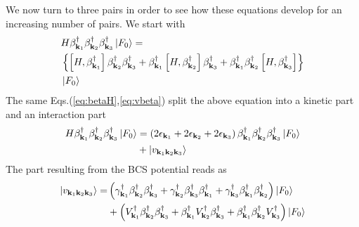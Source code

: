 \documentclass[aps,prb,superscriptaddress,twocolumn]{revtex4}
\begin{document}
We now turn to three pairs in order to see how these equations develop for an
increasing number of pairs. We start with 
\begin{equation}  \label{eq:SchThree}
\begin{split}
&H\beta^{\dagger}_{\mathbf{k} _1}\beta^{\dagger}_{\mathbf{k}
_2}\beta^{\dagger}_{\mathbf{k} _3}\left|F_0\right>   = \\
&\left\{\left[H,\beta^{\dagger}_{\mathbf{k} _1}\right]  \beta^{\dagger}_{%
\mathbf{k} _2}\beta^{\dagger}_{\mathbf{k} _3}+\beta^{\dagger}_{\mathbf{k} _1}%
\left[H,\beta^{\dagger}_{\mathbf{k} _2}\right]  \beta^{\dagger}_{\mathbf{k}
_3}+\beta^{\dagger}_{\mathbf{k} _1}\beta^{\dagger}_{\mathbf{k} _2}\left[%
H,\beta^{\dagger}_{\mathbf{k} _3}\right]  \right\}  \\
&\left|F_0\right>   \\
\end{split}%
\end{equation}
The same Eqs.(\ref{eq:betaH},\ref{eq:vbeta}) split the above equation into a kinetic part and an interaction part
\begin{equation}  \label{eq:SchThree2}
\begin{split}
H\beta^{\dagger}_{\mathbf{k} _1}\beta^{\dagger}_{\mathbf{k}
_2}\beta^{\dagger}_{\mathbf{k} _3}\left|F_0\right>   &=\left(2\epsilon_{%
\mathbf{k} _1}+2\epsilon_{\mathbf{k} _2}+2\epsilon_{\mathbf{k} _3}\right)
\beta^{\dagger}_{\mathbf{k} _1}\beta^{\dagger}_{\mathbf{k}
_2}\beta^{\dagger}_{\mathbf{k} _3}\left|F_0\right>   \\
&+\left|v_{\mathbf{k} _1\mathbf{k} _2\mathbf{k} _3}\right> 
\end{split}%
\end{equation}
The part resulting from the BCS potential reads as 
\begin{equation}  \label{eq:vThree}
\begin{split}
\left|v_{\mathbf{k} _1\mathbf{k} _2\mathbf{k} _3}\right> =
&\left(\gamma^{\dagger}_{\mathbf{k} _1}\beta^{\dagger}_{\mathbf{k}
_2}\beta^{\dagger}_{\mathbf{k} _3}+\gamma^{\dagger}_{\mathbf{k}
_2}\beta^{\dagger}_{\mathbf{k} _3}\beta^{\dagger}_{\mathbf{k}
_1}+\gamma^{\dagger}_{\mathbf{k} _3}\beta^{\dagger}_{\mathbf{k}
_1}\beta^{\dagger}_{\mathbf{k} _2}\right) \left|F_0\right>   \\
&+\left(V^{\dagger}_{\mathbf{k} _1}\beta^{\dagger}_{\mathbf{k}
_2}\beta^{\dagger}_{\mathbf{k} _3}+\beta^{\dagger}_{\mathbf{k}
_1}V^{\dagger}_{\mathbf{k} _2}\beta^{\dagger}_{\mathbf{k} _3}+\beta^{%
\dagger}_{\mathbf{k} _1}\beta^{\dagger}_{\mathbf{k} _2}V^{\dagger}_{\mathbf{k%
} _3}\right) \left|F_0\right>  
\end{split}%
\end{equation}
\end{document}
